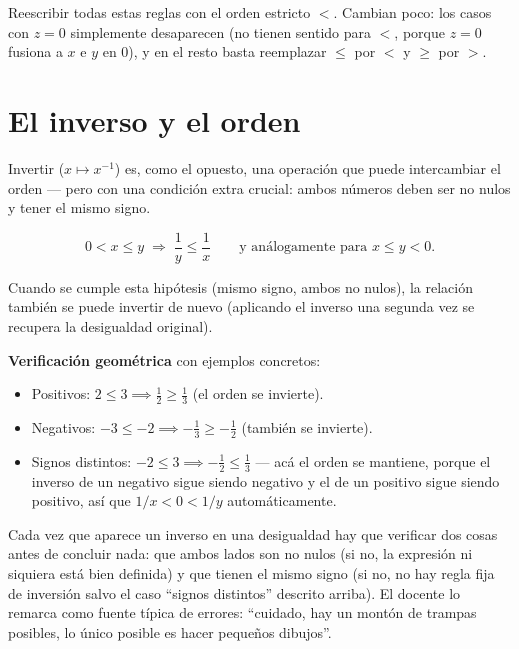 \documentclass[12pt,a4paper]{article}
\begin{document}
\begin{notebox}
Reescribir todas estas reglas con el orden estricto $<$. Cambian poco: los
casos con $z=0$ simplemente desaparecen (no tienen sentido para $<$, porque
$z=0$ fusiona a $x$ e $y$ en $0$), y en el resto basta reemplazar $\leq$ por
$<$ y $\geq$ por $>$.
\end{notebox}

\section{El inverso y el orden}

Invertir ($x \mapsto x^{-1}$) es, como el opuesto, una operación que puede
intercambiar el orden --- pero con una condición extra crucial: ambos
números deben ser no nulos y tener el mismo signo.

$$
\boxed{0 < x \leq y \;\Longrightarrow\; \frac{1}{y} \leq \frac{1}{x}}
\qquad\text{y análogamente para } x \leq y < 0.
$$

Cuando se cumple esta hipótesis (mismo signo, ambos no nulos), la relación
también se puede invertir de nuevo (aplicando el inverso una segunda vez se
recupera la desigualdad original).

\textbf{Verificación geométrica} con ejemplos concretos:

\begin{itemize}
  \item Positivos: $2 \leq 3 \implies \tfrac12 \geq \tfrac13$ (el orden se
    invierte).
  \item Negativos: $-3 \leq -2 \implies -\tfrac13 \geq -\tfrac12$ (también
    se invierte).
  \item Signos distintos: $-2 \leq 3 \implies -\tfrac12 \leq \tfrac13$ ---
    acá el orden se mantiene, porque el inverso de un negativo sigue siendo
    negativo y el de un positivo sigue siendo positivo, así que
    $1/x < 0 < 1/y$ automáticamente.
\end{itemize}



\begin{warnbox}
Cada vez que aparece un inverso en una desigualdad hay que verificar dos
cosas antes de concluir nada: que ambos lados son no nulos (si no, la
expresión ni siquiera está bien definida) y que tienen el mismo signo (si
no, no hay regla fija de inversión salvo el caso ``signos distintos''
descrito arriba). El docente lo remarca como fuente típica de errores:
``cuidado, hay un montón de trampas posibles, lo único posible es hacer
pequeños dibujos''.
\end{warnbox}
\end{document}

